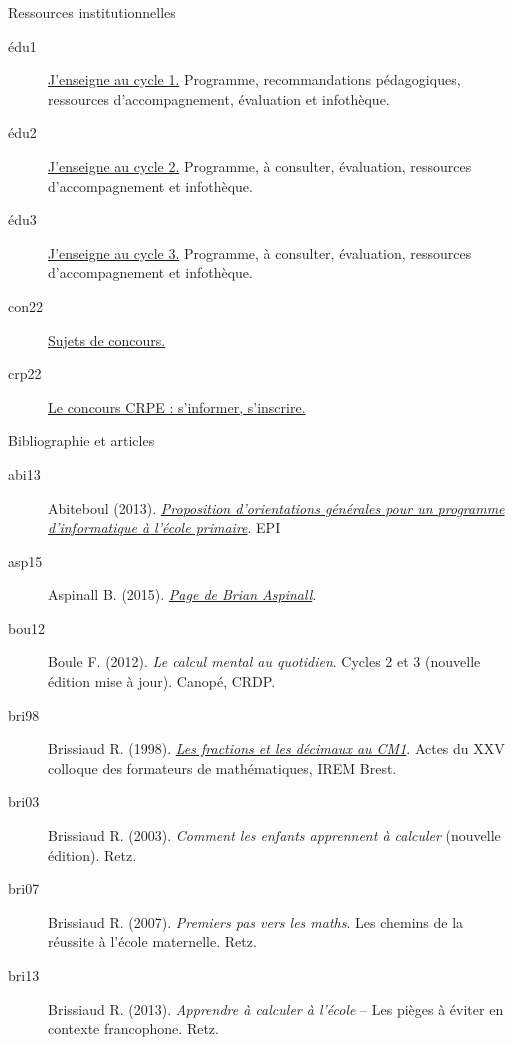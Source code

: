  \label{ref} 

\bigskip

{\setlength{\baselineskip}{1.2\baselineskip}

\textcolor{A1}{\Large Ressources institutionnelles}
\begin{description}
   \item[édu1] \href{https://eduscol.education.fr/83/j-enseigne-au-cycle-1}{J'enseigne au cycle 1.} Programme, recommandations pédagogiques, ressources d'accompagnement, évaluation et infothèque.
   \item[édu2] \href{https://eduscol.education.fr/84/j-enseigne-au-cycle-2}{J'enseigne au cycle 2.} Programme, à consulter, évaluation, ressources d'accompagnement et infothèque.
   \item[édu3] \href{https://eduscol.education.fr/87/j-enseigne-au-cycle-3}{J'enseigne au cycle 3.} Programme, à consulter, évaluation, ressources d'accompagnement et infothèque.
   \item[con22] \href{http://www.devenirenseignant.gouv.fr/cid98675/sujets-des-epreuves-ecrites-et-conseils-des-jurys-des-concours-de-recrutement-de-professeurs-des-ecoles.html}{Sujets de concours.}
   \item[crp22] \href{http://www.devenirenseignant.gouv.fr/pid33983/enseigner-maternelle-elementaire-crpe.html}{Le concours CRPE : s'informer, s'inscrire.}
\end{description} 

\bigskip

\textcolor{A1}{\Large Bibliographie et articles}
\begin{description}
   \item[abi13] Abiteboul (2013). \href{http://www.epi.asso.fr/revue/editic/itic-ecole-prog_2013-12.htm}{\it Proposition d'orientations générales pour un programme d'informatique à l'école primaire}. EPI
   
   \item[asp15] Aspinall B. (2015). \href{http://brianaspinall.com/10-reasons-to-teach-coding-sketchnote-by-sylviaduckworth/}{\it Page de Brian Aspinall}.
   
   \item[bou12] Boule F. (2012). {\it Le calcul mental au quotidien}. Cycles 2 et 3 (nouvelle édition mise à jour). Canopé, CRDP.

   \item[bri98] Brissiaud R. (1998). \href{http://page.perso.brissiaud.pagesperso-orange.fr/pages/Page2.html}{\it Les fractions et les décimaux au CM1}. Actes du {\small XXV} colloque des formateurs de mathématiques, IREM Brest.
   \item[bri03] Brissiaud R. (2003). {\it Comment les enfants apprennent à calculer} (nouvelle édition). Retz.
   \item[bri07] Brissiaud R. (2007). {\it Premiers pas vers les maths}. Les chemins de la réussite à l’école maternelle. Retz.
   \item[bri13] Brissiaud R. (2013). {\it Apprendre à calculer à l’école} – Les pièges à éviter en contexte francophone. Retz.
   

\end{description}}
